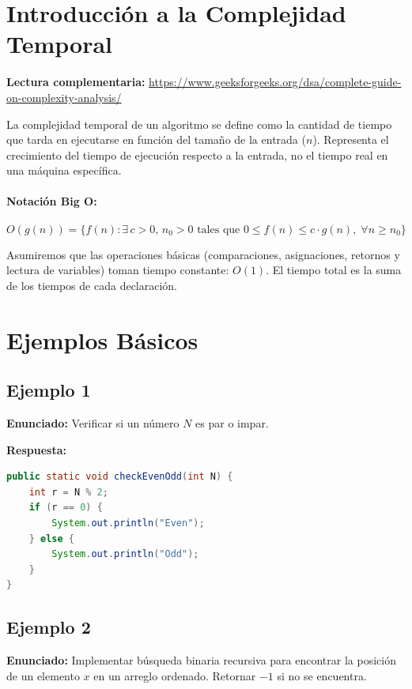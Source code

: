\documentclass[11pt,a4paper]{article}
\begin{document}
\thispagestyle{firstpage}

\section*{Introducción a la Complejidad Temporal}
\textbf{Lectura complementaria:} \url{https://www.geeksforgeeks.org/dsa/complete-guide-on-complexity-analysis/}

\vspace{0.2cm}
La complejidad temporal de un algoritmo se define como la cantidad de tiempo que tarda en ejecutarse en función del tamaño de la entrada ($n$). Representa el crecimiento del tiempo de ejecución respecto a la entrada, no el tiempo real en una máquina específica.

\paragraph{Notación Big O:}
\[
O(g(n)) = \{ f(n) : \exists\, c > 0, \, n_0 > 0 \text{ tales que } 0 \le f(n) \le c \cdot g(n), \; \forall n \ge n_0 \}
\]

Asumiremos que las operaciones básicas (comparaciones, asignaciones, retornos y lectura de variables) toman tiempo constante: $O(1)$. El tiempo total es la suma de los tiempos de cada declaración.

\section*{Ejemplos Básicos}

\subsection*{Ejemplo 1}
\textbf{Enunciado:} Verificar si un número $N$ es par o impar.

\textbf{Respuesta:}
\begin{lstlisting}[language=Java]
public static void checkEvenOdd(int N) {
    int r = N % 2;
    if (r == 0) {
        System.out.println("Even");
    } else {
        System.out.println("Odd");
    }
}
\end{lstlisting}

\subsection*{Ejemplo 2}
\textbf{Enunciado:} Implementar búsqueda binaria recursiva para encontrar la posición de un elemento $x$ en un arreglo ordenado. Retornar $-1$ si no se encuentra.
\end{document}

